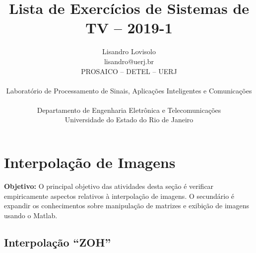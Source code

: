 \documentclass[11pt]{article}
\begin{document}
 

\title{Lista de Exercícios de Sistemas de TV -- 2019-1}
\author{Lisandro Lovisolo \\ lisandro@uerj.br \\ PROSAICO -- DETEL -- UERJ \\ \begin{small} Laboratório de Processamento de Sinais, Aplicações Inteligentes e Comunicações \end{small} \\ Departamento de Engenharia Eletrônica e Telecomunicações \\ Universidade do Estado do Rio de Janeiro}

\maketitle

\section{Interpolação de Imagens}

\textbf{Objetivo:} O principal objetivo das atividades desta seção é verificar empiricamente aspectos relativos à interpolação de imagens. O secundário é expandir os conhecimentos sobre manipulação de matrizes e exibição de imagens usando o \textsf{Matlab}.


\subsection{Interpolação ``ZOH''}
\end{document}
